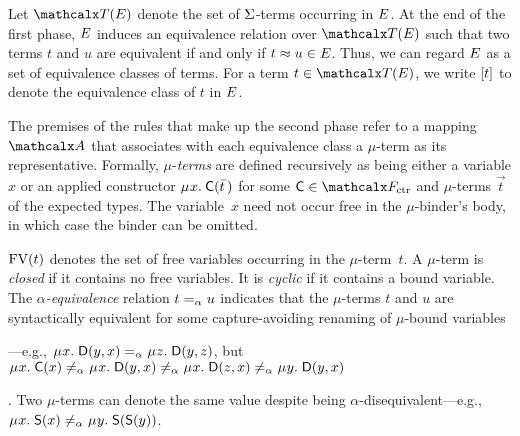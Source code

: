 Let $\tEc$ denote the set of $\mathrm{\Sigma}$-terms occurring in $E$.
At the end of the first phase, $E$ induces an equivalence
relation over $\tEc$ such that two terms $t$ and $u$ are equivalent if and
only if $t \approx u \in E$.
Thus, we can regard $E$ as a set of
equivalence classes of terms. For a term $t \in \tEc$, we write $[t]$ to
denote the equivalence class of $t$ in $E$.

The premises of the rules that make up the second phase refer to a mapping $\Val$
that associates with each equivalence class a $\mu$-term as its representative.
%
Formally, $\mu$-\emph{terms} are defined recursively as being either a variable $x$
or an applied constructor
$\MU x.\: \const{C}( \vec t\, )$ for some $\const{C} \in \Ctr$ and
$\mu$-terms $\vec t$ of the expected types.
The variable~$x$ need not occur free in the $\mu$-binder's body, in which case
the binder can be omitted.

$\mathrm{FV}( t )$ denotes the set of free variables occurring in the $\mu$-term~$t$.
A $\mu$-term is \emph{closed} if %
it contains no free variables. It is \emph{cyclic} if %
it contains a bound variable. The $\alpha$\emph{-equiv\-alence} relation $t \mathrel{=_\alpha} u$
indicates that the $\mu$-terms $t$ and $u$
are syntactically equivalent for some capture-avoiding renaming of $\mu$-bound variables\begin{rep}---e.g.,
$\MU x.\; \const{D}( y, x ) \aequiv \MU z.\; \const{D}( y, z )$,
but
$\MU x.\; \const{C}( x ) \not\aequiv \MU x.\; \const{D}( y, x ) \not\aequiv \MU x.\; \const{D}( z, x )
\not\aequiv \MU y.\; \const{D}( y, x )$\end{rep}.
Two $\mu$-terms can denote the same value despite being $\alpha$-disequivalent---e.g.,
$\MU x.\; \const{S}( x ) \not\aequiv \MU y.\; \const{S}( \const{S}( y ) )$.


